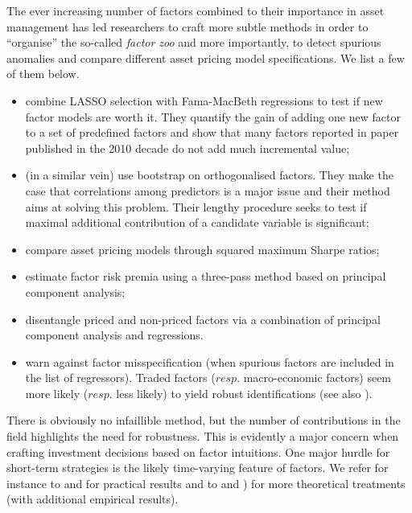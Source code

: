 \documentclass[]{krantz}
\providecommand{\tightlist}{%
  \setlength{\itemsep}{0pt}\setlength{\parskip}{0pt}}
\theoremstyle{definition}
\theoremstyle{definition}
\theoremstyle{definition}
\theoremstyle{remark}
\begin{document}
The ever increasing number of factors combined to their importance in
asset management has led researchers to craft more subtle methods in
order to ``organise'' the so-called \emph{factor zoo} and more
importantly, to detect spurious anomalies and compare different asset
pricing model specifications. We list a few of them below.

\begin{itemize}
\tightlist
\item
  \citet{feng2019taming} combine LASSO selection with Fama-MacBeth
  regressions to test if new factor models are worth it. They quantify
  the gain of adding one new factor to a set of predefined factors and
  show that many factors reported in paper published in the 2010 decade
  do not add much incremental value;\\
\item
  \citet{harvey2017lucky} (in a similar vein) use bootstrap on
  orthogonalised factors. They make the case that correlations among
  predictors is a major issue and their method aims at solving this
  problem. Their lengthy procedure seeks to test if maximal additional
  contribution of a candidate variable is significant;\\
\item
  \citet{fama2018choosing} compare asset pricing models through squared
  maximum Sharpe ratios;\\
\item
  \citet{giglio2018asset} estimate factor risk premia using a three-pass
  method based on principal component analysis;\\
\item
  \citet{pukthuanthong2018protocol} disentangle priced and non-priced
  factors via a combination of principal component analysis and
  \citet{fama1973risk} regressions.\\
\item
  \citet{gospodinov2019too} warn against factor misspecification (when
  spurious factors are included in the list of regressors). Traded
  factors (\(resp.\) macro-economic factors) seem more likely (\(resp.\)
  less likely) to yield robust identifications (see also
  \citet{bryzgalova2019spurious}).
\end{itemize}

There is obviously no infaillible method, but the number of
contributions in the field highlights the need for robustness. This is
evidently a major concern when crafting investment decisions based on
factor intuitions. One major hurdle for short-term strategies is the
likely time-varying feature of factors. We refer for instance to
\citet{ang2012testing} and \citet{cooper2018new} for practical results
and to \citet{gagliardini2016time} and \citet{ma2018testing}) for more
theoretical treatments (with additional empirical results).
\end{document}
